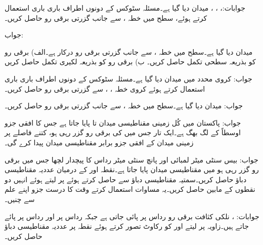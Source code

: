 جوابات:، ، ، 
میدان  دیا گیا ہے۔مسئلہ سٹوکس کے دونوں اطراف باری باری استعمال کرتے ہوئے،  سطح  میں خطہ ،  سے  جانب گزرتی برقی رو حاصل کریں۔

جواب:

میدان  دیا گیا ہے۔سطح  میں خطہ ،  سے  جانب گزرتی برقی رو درکار ہے۔الف) برقی رو کو بذریعہ سطحی تکمل حاصل کریں۔ ب) برقی رو کو بذریعہ لکیری تکمل حاصل کریں

جواب:
کروی محدد میں میدان  دیا گیا ہے۔مسئلہ سٹوکس کے دونوں اطراف باری باری استعمال کرتے ہوئے کروی خطہ ، ،  سے گزرتی برقی رو حاصل کریں۔

جواب:
میدان  دیا گیا ہے۔سطح  میں خطہ ،  سے  جانب گزرتی برقی رو حاصل کریں۔ 

جواب:
پاکستان میں کُل زمینی مقناطیسی میدان  تا  پایا جاتا ہے جس کا افقی جزو اوسطاً  کے لگ بھگ ہے۔ایک تار جس میں  کی برقی رو گزر رہی ہو، کتنے فاصلے پر زمینی میدان کے افقی جزو برابر مقناطیسی میدان پیدا کرے گی۔

جواب: 
بیس سنٹی میٹر لمبائی اور پانچ سنٹی میٹر رداس کا پیچدار لچھا جس میں برقی رو گزر رہی ہو میں مقناطیسی میدان  پایا جاتا ہے۔نقطہ  اور  کے درمیان عددیہ مقناطیسی دباؤ  حاصل کریں۔سمتیہ مقناطیسی دباؤ  سے حاصل کرتے ہوئے  پر  لیتے ہوئے انہیں دو نقطوں کے مابین  حاصل کریں۔یہ مساوات استعمال کرتے وقت  کا درست جزو اپنے علم سے چنیں۔

جوابات: ، 
نلکی کثافت برقی رو  رداس  پر پائی جاتی ہے جبکہ رداس  پر  اور رداس  پر  پائے جاتے ہیں۔زاویہ  پر  لیتے اور  کو رکاوٹ تصور کرتے ہوئے  نقطہ   پر عددیہ مقناطیسی دباؤ  حاصل کریں۔

